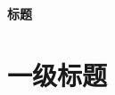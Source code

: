 \documentclass[UTF-8]{ctexart}
\renewcommand{\title}[1]{\begin{center}{\Large \textbf{#1}}\end{center}}
\begin{document}
\title{标题}

\section{一级标题}
\end{document}
